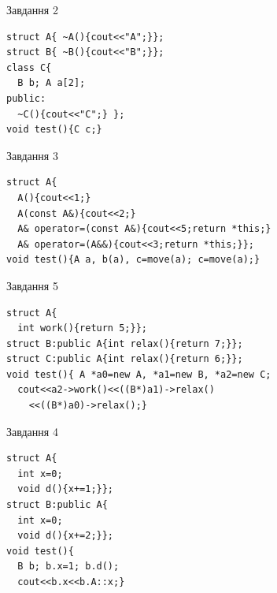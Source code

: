 \documentclass[12pt, ukrainian]{article}
\begin{document}
{{{{{{{{\begin{minipage}[t]{11cm}
               
{\begin{center}Завдання {2}\end{center}}
\vspace{-6mm}

\begin{verbatim}
struct A{ ~A(){cout<<"A";}};
struct B{ ~B(){cout<<"B";}};
class C{
  B b; A a[2];
public:
  ~C(){cout<<"C";} };
void test(){C c;}
\end{verbatim}            


               
{\begin{center}Завдання {3}\end{center}}
\vspace{-6mm}

\begin{verbatim}
struct A{
  A(){cout<<1;}
  A(const A&){cout<<2;}
  A& operator=(const A&){cout<<5;return *this;}
  A& operator=(A&&){cout<<3;return *this;}};
void test(){A a, b(a), c=move(a); c=move(a);}
\end{verbatim}            


               
{\begin{center}Завдання {5}\end{center}}
\vspace{-6mm}

\begin{verbatim}
struct A{
  int work(){return 5;}};
struct B:public A{int relax(){return 7;}};
struct C:public A{int relax(){return 6;}};
void test(){ A *a0=new A, *a1=new B, *a2=new C;
  cout<<a2->work()<<((B*)a1)->relax()
    <<((B*)a0)->relax();}
\end{verbatim}            


\end{minipage}
\vline \hspace{8mm}
\begin{minipage}[t]{7cm}
               
{\begin{center}Завдання {4}\end{center}}
\vspace{-6mm}

\begin{verbatim}
struct A{
  int x=0;
  void d(){x+=1;}};
struct B:public A{
  int x=0;
  void d(){x+=2;}};
void test(){
  B b; b.x=1; b.d();
  cout<<b.x<<b.A::x;}
\end{verbatim}            



\end{minipage}}}}}}}}}
\end{document}
